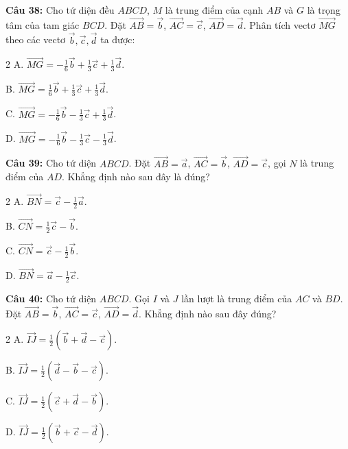 \documentclass[12pt]{article}
\begin{document}
	\vspace{0.2cm}
	\noindent \textbf{Câu 38:} Cho tứ diện đều $ABCD$, $M$ là trung điểm của cạnh $AB$ và $G$ là trọng tâm của tam giác $BCD$. Đặt $\overrightarrow{AB} = \vec{b}$, $\overrightarrow{AC} = \vec{c}$, $\overrightarrow{AD} = \vec{d}$. Phân tích vectơ $\overrightarrow{MG}$ theo các vectơ $\vec{b}, \vec{c}, \vec{d}$ ta được:
	\begin{multicols}{2}
		A. $\overrightarrow{MG} = -\frac{1}{6}\vec{b} + \frac{1}{3}\vec{c} + \frac{1}{3}\vec{d}$. \par
		B. $\overrightarrow{MG} = \frac{1}{6}\vec{b} + \frac{1}{3}\vec{c} + \frac{1}{3}\vec{d}$. \par
		C. $\overrightarrow{MG} = -\frac{1}{6}\vec{b} - \frac{1}{3}\vec{c} + \frac{1}{3}\vec{d}$. \par
		D. $\overrightarrow{MG} = -\frac{1}{6}\vec{b} - \frac{1}{3}\vec{c} - \frac{1}{3}\vec{d}$.
	\end{multicols}
	
	\vspace{0.2cm}
	\noindent \textbf{Câu 39:} Cho tứ diện $ABCD$. Đặt $\overrightarrow{AB} = \vec{a}$, $\overrightarrow{AC} = \vec{b}$, $\overrightarrow{AD} = \vec{c}$, gọi $N$ là trung điểm của $AD$. Khẳng định nào sau đây là đúng?
	\begin{multicols}{2}
		A. $\overrightarrow{BN} = \vec{c} - \frac{1}{2}\vec{a}$. \par
		B. $\overrightarrow{CN} = \frac{1}{2}\vec{c} - \vec{b}$. \par
		C. $\overrightarrow{CN} = \vec{c} - \frac{1}{2}\vec{b}$. \par
		D. $\overrightarrow{BN} = \vec{a} - \frac{1}{2}\vec{c}$.
	\end{multicols}
	
	\vspace{0.2cm}
	\noindent \textbf{Câu 40:} Cho tứ diện $ABCD$. Gọi $I$ và $J$ lần lượt là trung điểm của $AC$ và $BD$. Đặt $\overrightarrow{AB} = \vec{b}$, $\overrightarrow{AC} = \vec{c}$, $\overrightarrow{AD} = \vec{d}$. Khẳng định nào sau đây đúng?
	\begin{multicols}{2}
		A. $\overrightarrow{IJ} = \frac{1}{2}(\vec{b} + \vec{d} - \vec{c})$. \par
		B. $\overrightarrow{IJ} = \frac{1}{2}(\vec{d} - \vec{b} - \vec{c})$. \par
		C. $\overrightarrow{IJ} = \frac{1}{2}(\vec{c} + \vec{d} - \vec{b})$. \par
		D. $\overrightarrow{IJ} = \frac{1}{2}(\vec{b} + \vec{c} - \vec{d})$.
	\end{multicols}
	
\end{document}
